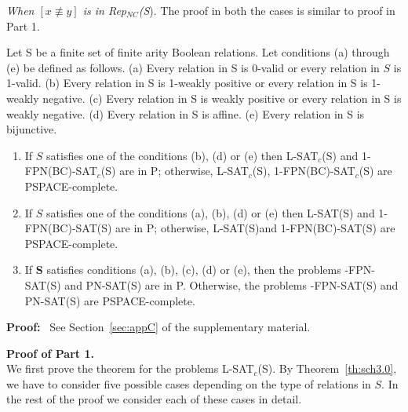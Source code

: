 \noindent
{\em When $[x \not\equiv y ]$  is in {\sf Rep}$_{NC}$({\sf S}}).
The proof in both the cases is similar to proof in Part 1.\QED
\fi


\begin{theorem}\label{th:hsat_charcterize4}
Let S be a finite set of finite arity Boolean relations. Let conditions
(a) through (e) be defined as follows.
(a) Every relation in S is 0-valid or every relation in $S$ is 1-valid.
(b) Every relation in S is 1-weakly positive or
every relation in S is 1-weakly negative.
(c) Every relation in S is weakly positive or
every relation in S is weakly negative.
(d) Every relation in S is affine.
(e) Every relation in S is bijunctive.
\begin{enumerate}
\item
If $S$ satisfies one of the conditions (b), (d) or (e)
then L-SAT$_c$(S) and 1-FPN(BC)-SAT$_c$(S) are in P; otherwise,
L-SAT$_c$(S), 1-FPN(BC)-SAT$_c$(S) are  PSPACE-complete.

\item
If $S$ satisfies one of the conditions (a), (b), (d) or (e)
then L-SAT(S) and 1-FPN(BC)-SAT(S) are in P; otherwise, L-SAT(S)and 
1-FPN(BC)-SAT(S) are PSPACE-complete.

\item
If {\bf S} satisfies conditions (a), (b), (c), (d) or  (e), then the problems  
{-FPN-SAT(S)} and PN-SAT(S)  are in P. Otherwise, 
the problems  {-FPN-SAT(S)} and PN-SAT(S)  are  PSPACE-complete.
\end{enumerate}
\end{theorem}

\noindent
\textbf{Proof:}~ See Section~\ref{sec:appC} of the supplementary material.

\iffalse
\noindent
{\bf Proof of Part 1.}\\
We first prove the theorem for the problems L-SAT$_c$(S).
By Theorem~\ref{th:sch3.0}, we have to consider five possible cases
depending on the type of relations in $S$. In the rest of the proof we
consider each of these cases in detail.

